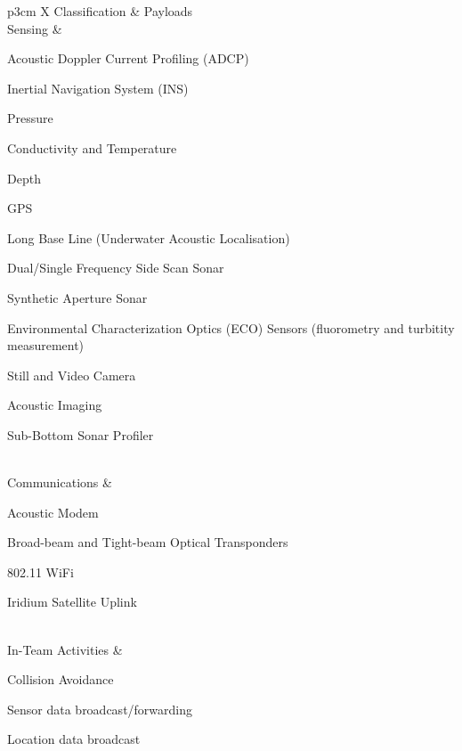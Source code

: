 \begin{table}
	\caption{Summary of Generalised AUV capabilities}
	\label{tab:auv_capabilities}
	\begin{tabularx}{\textwidth}{p{3cm} X}\toprule
		Classification & Payloads \\\midrule
		Sensing &  
		\begin{minipage}[t]{\linewidth}
			\begin{tightimize}
				\item Acoustic Doppler Current Profiling (ADCP)
				\item Inertial Navigation System (INS)
				\item Pressure
				\item Conductivity and Temperature
				\item Depth
				\item GPS
				\item Long Base Line (Underwater Acoustic Localisation)
				\item Dual/Single Frequency Side Scan Sonar
				\item Synthetic Aperture Sonar
				\item Environmental Characterization Optics (ECO) Sensors (fluorometry and turbitity measurement)
				\item Still and Video Camera
				\item Acoustic Imaging
				\item Sub-Bottom Sonar Profiler
			\end{tightimize}
		\end{minipage}\\\midrule
		Communications &  
		\begin{minipage}[t]{\linewidth}
			\begin{tightimize}
				\item Acoustic Modem
				\item Broad-beam and Tight-beam Optical Transponders
				\item 802.11 WiFi
				\item Iridium Satellite Uplink
			\end{tightimize}
		\end{minipage}\\\midrule
		In-Team Activities & 
		\begin{minipage}[t]{\linewidth}
			\begin{tightimize}
				\item Collision Avoidance
				\item Sensor data broadcast/forwarding
				\item Location data broadcast

\end{tightimize}
\end{minipage}
\end{tabularx}
\end{table}
